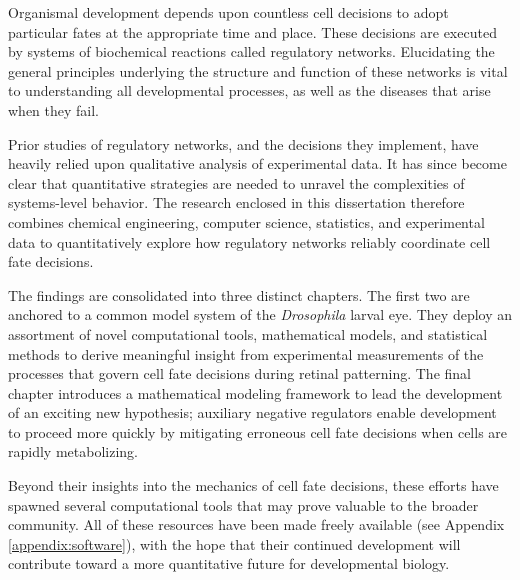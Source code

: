 Organismal development depends upon countless cell decisions to adopt particular fates at the appropriate time and place. These decisions are executed by systems of biochemical reactions called regulatory networks. Elucidating the general principles underlying the structure and function of these networks is vital to understanding all developmental processes, as well as the diseases that arise when they fail. 

Prior studies of regulatory networks, and the decisions they implement, have heavily relied upon qualitative analysis of experimental data. It has since become clear that quantitative strategies are needed to unravel the complexities of systems-level behavior. The research enclosed in this dissertation therefore combines chemical engineering, computer science, statistics, and experimental data to quantitatively explore how regulatory networks reliably coordinate cell fate decisions.

The findings are consolidated into three distinct chapters. The first two are anchored to a common model system of the \textit{Drosophila} larval eye. They deploy an assortment of novel computational tools, mathematical models, and statistical methods to derive meaningful insight from experimental measurements of the processes that govern cell fate decisions during retinal patterning. The final chapter introduces a mathematical modeling framework to lead the development of an exciting new hypothesis; auxiliary negative regulators enable development to proceed more quickly by mitigating erroneous cell fate decisions when cells are rapidly metabolizing.

Beyond their insights into the mechanics of cell fate decisions, these efforts have spawned several computational tools that may prove valuable to the broader community. All of these resources have been made freely available (see Appendix \ref{appendix:software}), with the hope that their continued development will contribute toward a more quantitative future for developmental biology.

